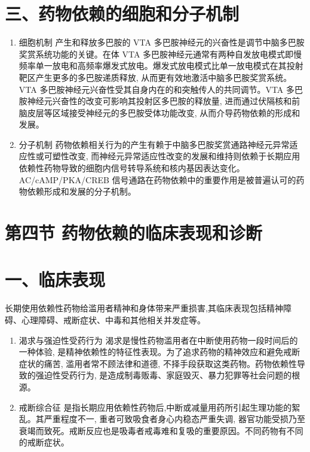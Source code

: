 \documentclass[10pt]{article}
\begin{document}
\section*{三、药物依赖的细胞和分子机制}
\begin{enumerate}
  \item 细胞机制 产生和释放多巴胺的 VTA 多巴胺神经元的兴奋性是调节中脑多巴胺奖赏系统功能的关键。在体 VTA 多巴胺神经元通常有两种自发放电模式即慢频率单一放电和高频率爆发式放电。爆发式放电模式比单一放电模式在其投射靶区产生更多的多巴胺递质释放, 从而更有效地激活中脑多巴胺奖赏系统。VTA 多巴胺神经元兴奋性受其自身内在的和突触传人的共同调节。VTA 多巴胺神经元兴奋性的改变可影响其投射区多巴胺的释放量, 进而通过伏隔核和前脑皮层等区域接受神经元的多巴胺受体功能改变, 从而介导药物依赖的形成和发展。

  \item 分子机制 药物依赖相关行为的产生有赖于中脑多巴胺奖赏通路神经元异常适应性或可塑性改变, 而神经元异常适应性改变的发展和维持则依赖于长期应用依赖性药物导致的细胞内信号转导系统和核内基因表达变化。AC/cAMP/PKA/CREB 信号通路在药物依赖中的重要作用是被普遍认可的药物依赖形成和发展的分子机制。

\end{enumerate}

\section*{第四节 药物依赖的临床表现和诊断}
\section*{一、临床表现}
长期使用依赖性药物给滥用者精神和身体带来严重损害,其临床表现包括精神障碍、心理障碍、戒断症状、中毒和其他相关并发症等。

\begin{enumerate}
  \item 渴求与强迫性受药行为 渴求是慢性药物滥用者在中断使用药物一段时间后的一种体验, 是精神依赖性的特征性表现。为了追求药物的精神效应和避免戒断症状的痛苦, 滥用者常不顾法律和道德, 不择手段获取这类药物。药物依赖性导致的强迫性受药行为, 是造成制毒贩毒、家庭毁灭、暴力犯罪等社会问题的根源。

  \item 戒断综合征 是指长期应用依赖性药物后,中断或减量用药所引起生理功能的絮乱。其严重程度不一, 重者可致吸食者身心内稳态严重失调, 器官功能受损乃至衰竭而致死。戒断反应也是吸毒者戒毒难和复吸的重要原因。不同药物有不同的戒断症状。

\end{enumerate}
\end{document}
